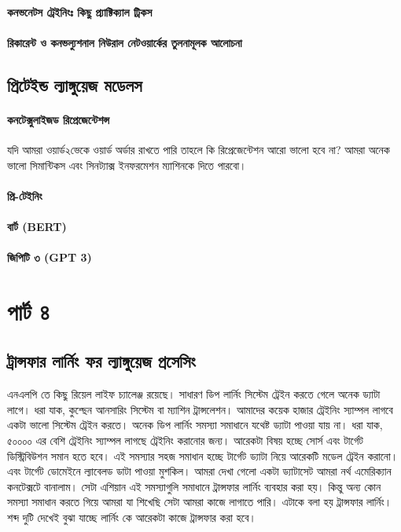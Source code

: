 \documentclass{book}
\begin{document}
\subsection{কনভনেটস ট্রেইনিংঃ  কিছু প্র্যাক্টিক্যাল ট্রিকস}

\subsection{রিকারেন্ট ও কনভল্যুশনাল নিউরাল নেটওয়ার্কের তুলনামূলক আলোচনা}

\chapter{প্রিটেইন্ড ল্যাঙ্গুয়েজ মডেলস}
\subsection{কনটেক্সুলাইজড রিপ্রেজেন্টেশন্স}
যদি আমরা ওয়ার্ড২ভেকে ওয়ার্ড অর্ডার রাখতে পারি তাহলে কি রিপ্রেজেন্টেশন আরো ভালো হবে না? আমরা অনেক ভালো সিমান্টিকস এবং সিনট্যাক্স 
ইনফরমেশন ম্যাশিনকে দিতে পারবো। 

\subsection{প্রি-টেইনিং}

\subsection{বার্ট (BERT)}

\subsection{জিপিটি ৩ (GPT 3)}


 \part{পার্ট ৪} 



\chapter{ট্রান্সফার লার্নিং ফর ল্যাঙ্গুয়েজ প্রসেসিং}
এনএলপি তে কিছু রিয়েল লাইফ চ্যালেঞ্জ রয়েছে। সাধারণ ডিপ লার্নিং সিস্টেম ট্রেইন করতে গেলে অনেক ড্যাটা লাগে। ধরা যাক, কুশ্ছেন আনসারিং সিস্টেম বা ম্যাশিন ট্রান্সলেশন। আমাদের কয়েক হাজার ট্রেইনিং স্যাম্পল লাগবে একটা ভালো সিস্টেম ট্রেইন করতে।  অনেক ডিপ লার্নিং সমস্যা সমাধানে যথেষ্ট ড্যাটা পাওয়া যায় না। ধরা যাক, ৫০০০০ এর বেশি ট্রেইনিং স্যাম্পল লাগছে ট্রেইনিং করানোর জন্য। আরেকটা বিষয় হচ্ছে সোর্স এবং টার্গেট ডিস্ট্রিবিউশন সমান হতে হবে। এই সমস্যার সহজ সমাধান হচ্ছে টার্গেট ড্যাটা নিয়ে আরেকটি মডেল ট্রেইন করানো। এবং টার্গেট ডোমেইনে ল্যাবেলড ডাটা পাওয়া মুশকিল। আমরা দেখা গেলো একটা ড্যাটাসেট আমরা নর্থ এমেরিক্যান কনটেক্সটে বানালাম। সেটা এশিয়ান এই সমস্যাগুলি সমাধানে ট্রান্সফার লার্নিং ব্যবহার করা হয়। কিন্তু অন্য কোন সমস্যা সমাধান করতে গিয়ে আমরা যা শিখেছি সেটা আমরা কাজে লাগাতে পারি। এটাকে বলা হয় ট্রান্সফার লার্নিং। শব্দ দুটি দেখেই বুঝা যাচ্ছে লার্নিং কে আরেকটা কাজে ট্রান্সফার করা হবে। 
\end{document}
